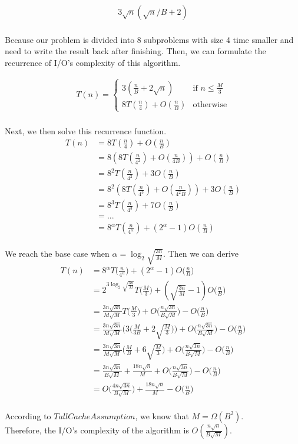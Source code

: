 \begin{align*}
    3\sqrt{n}(\sqrt{n}/B + 2)
\end{align*}
\\
Because our problem is divided into $8$ subproblems with size 4 time smaller and need to write the result back after finishing.
Then, we can formulate the recurrence of I/O's complexity of this algorithm.

\begin{align*}
	T(n) = \begin{cases}
	    3( \frac{n}{B} + 2\sqrt{n} ) & \text{if } n \leq \frac{M}{3}\\
	    8T(\frac{n}{4}) + O(\frac{n}{B})              & \text{otherwise}
	\end{cases}
\end{align*}
\\

Next, we then solve this recurrence function.
\begin{align*}
T(n) &= 8T(\frac{n}{4}) + O(\frac{n}{B}) \\
&= 8( 8T(\frac{n}{4^2}) + O(\frac{n}{4B}) ) + O(\frac{n}{B}) \\
&= 8^2T(\frac{n}{4^2}) + 3O(\frac{n}{B}) \\
&= 8^2( 8T(\frac{n}{4^3}) + O(\frac{n}{4^2B}) ) + 3O(\frac{n}{B}) \\
&= 8^3T(\frac{n}{4^3}) + 7O(\frac{n}{B}) \\
&= ... \\
&= 8^{\alpha}T(\frac{n}{4^\alpha}) + ( 2^\alpha - 1 )O(\frac{n}{B})
\end{align*}
\\
We reach the base case when $\alpha = \log_2{ \sqrt{ \frac{3n}{M} }}$. Then we can derive
\begin{align*}
T(n) &= 8^{\alpha}T\Big(\frac{n}{4^\alpha}\Big) + ( 2^{\alpha} - 1 )O\Big(\frac{n}{B}\Big) \\
&= 2^{3\log_2{ \sqrt{ \frac{3n}{M} }}} T\Big( \frac{M}{3} \Big) + ( \sqrt{ \frac{3n}{M} } - 1 )O\Big(\frac{n}{B}\Big) \\
&= \frac{3n\sqrt{3n}}{M\sqrt{M}} T\Big( \frac{M}{3} \Big) + O\Big(\frac{n\sqrt{3n}}{B\sqrt{M}}\Big) - O\Big(\frac{n}{B}\Big)\\
&= \frac{3n\sqrt{3n}}{M\sqrt{M}} \Big( 3 \Big(\frac{M}{3B} + 2\sqrt{\frac{M}{3}}\Big)\Big) + O\Big(\frac{n\sqrt{3n}}{B\sqrt{M}}\Big)- O\Big(\frac{n}{B}\Big) \\
&= \frac{3n\sqrt{3n}}{M\sqrt{M}} \Big( \frac{M}{B} + 6\sqrt{\frac{M}{3}}\Big) + O\Big(\frac{n\sqrt{3n}}{B\sqrt{M}}\Big)- O\Big(\frac{n}{B}\Big) \\
&= \frac{3n\sqrt{3n}}{B\sqrt{M}} + \frac{18n\sqrt{n}}{M} + O\Big(\frac{n\sqrt{3n}}{B\sqrt{M}}\Big)- O\Big(\frac{n}{B}\Big) \\
&= O\Big(\frac{4n\sqrt{3n}}{B\sqrt{M}}\Big) + \frac{18n\sqrt{n}}{M} - O\Big(\frac{n}{B}\Big)
\end{align*}
\\
According to $Tall Cache Assumption$, we know that $M = \Omega(B^2)$.
\\
Therefore, the I/O's complexity of the algorithm is $O(\frac{n\sqrt{n}}{B\sqrt{M}})$.


